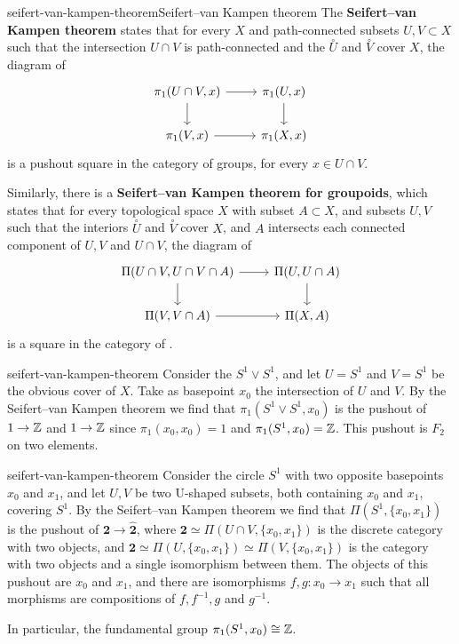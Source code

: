 \begin{topic}{seifert-van-kampen-theorem}{Seifert--van Kampen theorem}
    The \textbf{Seifert--van Kampen theorem} states that for every   $X$ and path-connected subsets $U, V \subset X$ such that the intersection $U \cap V$ is path-connected and the  $\overset{\circ}{U}$ and $\overset{\circ}{V}$ cover $X$, the diagram of 
    \[ \begin{tikzcd} \pi_1(U \cap V, x) \arrow{d} \arrow{r} & \pi_1(U, x) \arrow{d} \\ \pi_1(V, x) \arrow{r} & \pi_1(X, x) \end{tikzcd} \]
    is a pushout square in the category of groups, for every $x \in U \cap V$.

    Similarly, there is a \textbf{Seifert--van Kampen theorem for groupoids}, which states that for every topological space $X$ with subset $A \subset X$, and subsets $U, V$ such that the interiors $\overset{\circ}{U}$ and $\overset{\circ}{V}$ cover $X$, and $A$ intersects each connected component of $U, V$ and $U \cap V$, the diagram of 
    \[ \begin{tikzcd} \Pi(U \cap V, U \cap V \cap A) \arrow{d} \arrow{r} & \Pi(U, U \cap A) \arrow{d} \\ \Pi(V, V \cap A) \arrow{r} & \Pi(X, A) \end{tikzcd} \]
    is a  square in the category of .
\end{topic}

\begin{example}{seifert-van-kampen-theorem}
    Consider the  $S^1 \vee S^1$, and let $U = S^1$ and $V = S^1$ be the obvious cover of $X$. Take as basepoint $x_0$ the intersection of $U$ and $V$. By the Seifert--van Kampen theorem we find that $\pi_1(S^1 \vee S^1, x_0)$ is the pushout of $1 \to \mathbb{Z}$ and $1 \to \mathbb{Z}$ since $\pi_1(x_0, x_0) = 1$ and $\pi_1(S^1, x_0) = \mathbb{Z}$. This pushout is  $F_2$ on two elements.
\end{example}

\begin{example}{seifert-van-kampen-theorem}
    Consider the circle $S^1$ with two opposite basepoints $x_0$ and $x_1$, and let $U, V$ be two U-shaped subsets, both containing $x_0$ and $x_1$, covering $S^1$. By the Seifert--van Kampen theorem we find that $\Pi(S^1, \{ x_0, x_1 \})$ is the pushout of $\textbf{2} \to \hat{\textbf{2}}$, where $\textbf{2} \simeq \Pi(U \cap V, \{ x_0, x_1 \})$ is the discrete category with two objects, and $\hat{\textbf{2}} \simeq \Pi(U, \{ x_0, x_1 \}) \simeq \Pi(V, \{ x_0, x_1 \})$ is the category with two objects and a single isomorphism between them. The objects of this pushout are $x_0$ and $x_1$, and there are isomorphisms $f, g : x_0 \to x_1$ such that all morphisms are compositions of $f, f^{-1}, g$ and $g^{-1}$.
    
    In particular, the fundamental group $\pi_1(S^1, x_0) \cong \mathbb{Z}$.
\end{example}


